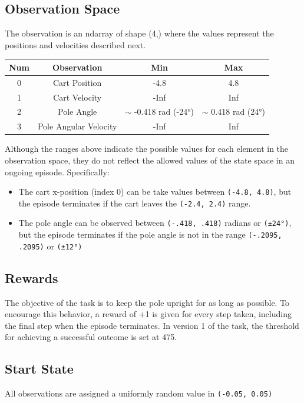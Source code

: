 \documentclass{article} %
\begin{document}
\subsection{Observation Space}

The observation is an ndarray of shape (4,) where the values represent the positions and
velocities described next.

\begin{center}
    \begin{tabular}{cccc}
        \toprule
        Num & Observation & Min & Max \\
        \midrule
        0 & Cart Position & -4.8 & 4.8 \\
        1 & Cart Velocity & -Inf & Inf \\
        2 & Pole Angle & $\sim$ -0.418 rad (-24°) & $\sim$ 0.418 rad (24°) \\
        3 & Pole Angular Velocity & -Inf & Inf \\
        \bottomrule
    \end{tabular}
\end{center}

Although the ranges above indicate the possible values for each element in the observation
space, they do not reflect the allowed values of the state space in an ongoing episode.
Specifically:

\begin{itemize}
    \item The cart x-position (index 0) can be take values between \verb|(-4.8, 4.8)|,
    but the episode terminates if the cart leaves the \verb|(-2.4, 2.4)| range.
    \item The pole angle can be observed between \verb|(-.418, .418)| radians
    or \verb|(±24°)|, but the
    episode terminates if the pole angle is not in the range \verb|(-.2095, .2095)|
    or \verb|(±12°)|
\end{itemize}

\subsection{Rewards}

The objective of the task is to keep the pole upright for as long as possible. To encourage
this behavior, a reward of +1 is given for every step taken, including the final step when
the episode terminates. In version 1 of the task, the threshold for achieving a successful
outcome is set at 475.

\subsection{Start State}
All observations are assigned a uniformly random value in \verb|(-0.05, 0.05)|
\end{document}
